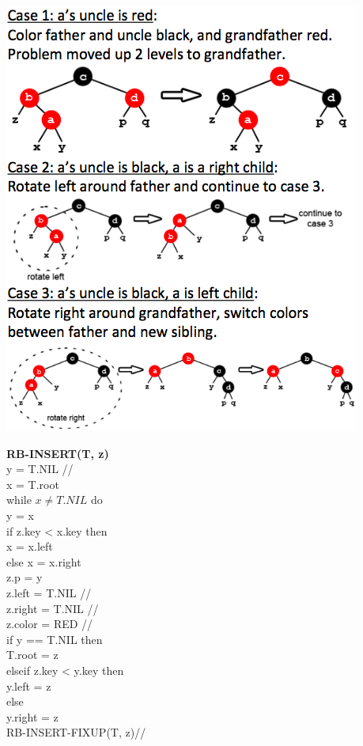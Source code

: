 \documentclass[10pt,landscape]{article}
\begin{document}
\begin{multicols}{3}
\includegraphics[scale=0.5]{RBtree.png}


\textbf{RB-INSERT(T, z)}
\\\quad y = T.NIL //
\\\quad x = T.root
\\\quad while $x \ne T.NIL$ do
\\\quad \quad y = x
\\\quad \quad if z.key < x.key then
\\\quad \quad \quad x = x.left
\\\quad \quad else x = x.right
\\\quad z.p = y
\\\quad z.left = T.NIL //
\\\quad z.right = T.NIL //
\\\quad z.color = RED //
\\\quad if y == T.NIL then
\\\quad \quad T.root = z
\\\quad elseif z.key < y.key then
\\\quad \quad y.left = z
\\\quad else 
\\\quad \quad y.right = z
\\\quad RB-INSERT-FIXUP(T, z)//


\end{multicols}
\end{document}
